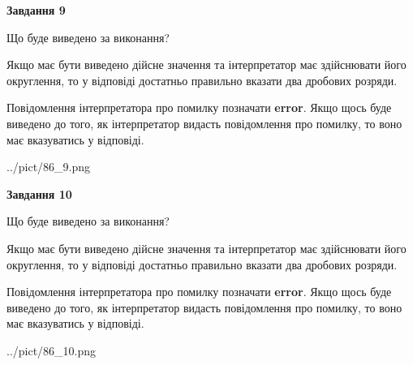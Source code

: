 \documentclass[12pt, ukrainian]{article}
\begin{document}
{\begin {Large}
{\begin {center}\textbf{Завдання 9}\end {center}}\par
Що буде виведено за виконання? \par

Якщо має бути виведено дійсне значення та інтерпретатор має здійснювати його округлення, 
то у відповіді достатньо правильно вказати два дробових розряди.

Повідомлення інтерпретатора про помилку позначати \textbf{error}.
Якщо щось буде виведено до того, як інтерпретатор видасть повідомлення про помилку, 
то воно має вказуватись у відповіді. \par

\begin{center}
	{../pict/86_9.png}
\end{center}
\newpage

{\begin {center}\textbf{Завдання 10}\end {center}}\par
Що буде виведено за виконання? \par

Якщо має бути виведено дійсне значення та інтерпретатор має здійснювати його округлення, 
то у відповіді достатньо правильно вказати два дробових розряди.

Повідомлення інтерпретатора про помилку позначати \textbf{error}.
Якщо щось буде виведено до того, як інтерпретатор видасть повідомлення про помилку, 
то воно має вказуватись у відповіді. \par

\begin{center}
	{../pict/86_10.png}
\end{center}
\newpage

\end {Large}}
\end{document}
